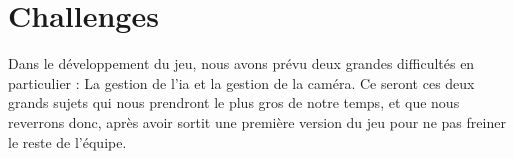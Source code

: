 \part{Challenges}

Dans le développement du jeu, nous avons prévu deux grandes difficultés en particulier : La gestion de l'\ac{ia} et la gestion de la caméra.
Ce seront ces deux grands sujets qui nous prendront le plus gros de notre temps, et que nous reverrons donc, après avoir sortit une première version du jeu pour ne pas freiner le reste de l'équipe.



